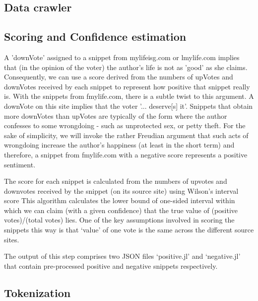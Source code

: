 \documentclass[11pt, letterpaper, conference, final, twocolumn]{ieeeconf}
\begin{document}
\subsection{Data crawler}
\label{ssec:crawler}

\subsection{Scoring and Confidence estimation}
\label{ssec:scoring}

A 'downVote' assigned to a snippet from mylifeisg.com or lmylife.com implies
that (in the opinion of the voter) the author's life is not as 'good' as she
claims. Consequently, we can use a score derived from the numbers of upVotes
and downVotes received by each snippet to represent how positive that snippet
really is. With the snippets from fmylife.com, there is a subtle twist to this
argument. A downVote on this site implies that the voter '... deserve[s] it'.
Snippets that obtain more downVotes than upVotes are typically of the form
where the author confesses to some wrongdoing - such as unprotected sex, or
petty theft. For the sake of simplicity, we will invoke the rather Freudian
argument that such acts of wrongdoing increase the author's happiness (at least
in the short term) and therefore, a snippet from fmylife.com with a negative
score represents a positive sentiment.

The score for each snippet is calculated from the numbers of upvotes and
downvotes received by the snippet (on its source site) using Wilson's interval score
This algorithm calculates the lower bound of one-sided interval within which we
can claim (with a given confidence) that the true value of (positive
votes)/(total votes) lies. One of the key assumptions involved in scoring the snippets this way is that `value' of one vote is the same across the different source sites. 

The output of this step comprises two JSON files `positive.jl' and `negative.jl' that contain pre-processed positive and negative snippets respectively.

\subsection{Tokenization}
\label{ssec:tokenization}
\end{document}
